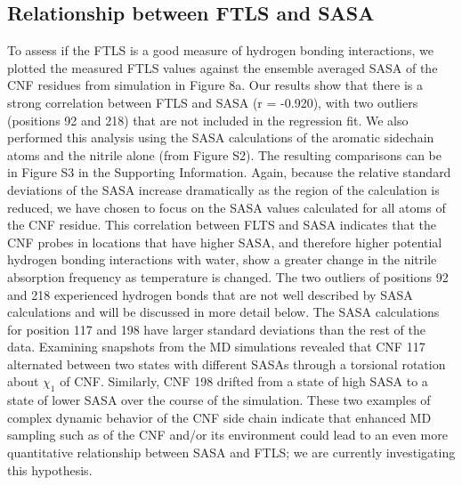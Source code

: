 \subsection{Relationship between FTLS and SASA}

To assess if the FTLS is a good measure of hydrogen bonding interactions, we plotted the measured FTLS values against the ensemble averaged SASA of the CNF residues from simulation in Figure 8a.
Our results show that there is a strong correlation between FTLS and SASA (r = -0.920), with two outliers (positions 92 and 218) that are not included in the regression fit.
We also performed this analysis using the SASA calculations of the aromatic sidechain atoms and the nitrile alone (from Figure S2).
The resulting comparisons can be in Figure S3 in the Supporting Information.
Again, because the relative standard deviations of the SASA increase dramatically as the region of the calculation is reduced, we have chosen to focus on the SASA values calculated for all atoms of the CNF residue.
This correlation between FLTS and SASA indicates that the CNF probes in locations that have higher SASA, and therefore higher potential hydrogen bonding interactions with water, show a greater change in the nitrile absorption frequency as temperature is changed.
The two outliers of positions 92 and 218 experienced hydrogen bonds that are not well described by SASA calculations and will be discussed in more detail below.
The SASA calculations for position 117 and 198 have larger standard deviations than the rest of the data.
Examining snapshots from the MD simulations revealed that CNF 117 alternated between two states with different SASAs through a torsional rotation about $\chi_1$ of CNF.
Similarly, CNF 198 drifted from a state of high SASA to a state of lower SASA over the course of the simulation.
These two examples of complex dynamic behavior of the CNF side chain indicate that enhanced MD sampling such as of the CNF and/or its environment could lead to an even more quantitative relationship between SASA and FTLS; we are currently investigating this hypothesis. 


